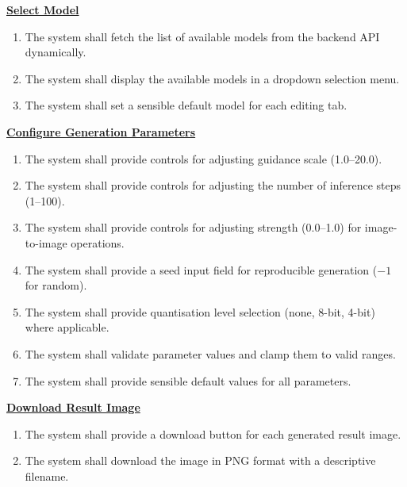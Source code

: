 \documentclass[12pt,a4paper]{report}
\begin{document}
\vspace{0.5em}
\noindent\underline{\textbf{Select Model}}

\begin{enumerate}[label=\textbf{FR-\arabic*}.,start=25]
    \item The system shall fetch the list of available models from the backend API dynamically.
    \item The system shall display the available models in a dropdown selection menu.
    \item The system shall set a sensible default model for each editing tab.
\end{enumerate}

\vspace{0.5em}
\noindent\underline{\textbf{Configure Generation Parameters}}

\begin{enumerate}[label=\textbf{FR-\arabic*}.,start=28]
    \item The system shall provide controls for adjusting guidance scale (1.0--20.0).
    \item The system shall provide controls for adjusting the number of inference steps (1--100).
    \item The system shall provide controls for adjusting strength (0.0--1.0) for image-to-image operations.
    \item The system shall provide a seed input field for reproducible generation ($-1$ for random).
    \item The system shall provide quantisation level selection (none, 8-bit, 4-bit) where applicable.
    \item The system shall validate parameter values and clamp them to valid ranges.
    \item The system shall provide sensible default values for all parameters.
\end{enumerate}

\vspace{0.5em}
\noindent\underline{\textbf{Download Result Image}}

\begin{enumerate}[label=\textbf{FR-\arabic*}.,start=35]
    \item The system shall provide a download button for each generated result image.
    \item The system shall download the image in PNG format with a descriptive filename.
\end{enumerate}
\end{document}
